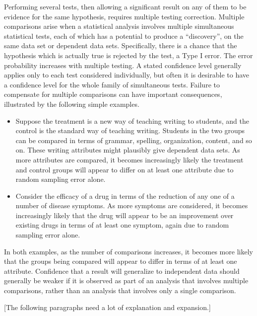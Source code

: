 \documentclass[12pt]{article}
\begin{document}
Performing several tests, then allowing a significant result on any of
them to be evidence for the same hypothesis, requires multiple testing
correction.  Multiple comparisons%
arise when a statistical analysis involves multiple simultaneous
statistical tests, each of which has a potential to produce a
``discovery'', on the same data set or dependent data sets.  Specifically,
there is a chance that the hypothesis which is actually true is rejected
by the test, a Type I error.  The error probability increases with
multiple testing.  A stated confidence level generally applies only to
each test considered individually, but often it is desirable to have a
confidence level for the whole family of simultaneous tests.  Failure to
compensate for multiple comparisons can have important consequences,
illustrated by the following simple examples.
\begin{itemize}
    \item
        Suppose the treatment is a new way of teaching writing to
        students, and the control is the standard way of teaching
        writing.  Students in the two groups can be compared in terms of
        grammar, spelling, organization, content, and so on.  These
        writing attributes might plausibly give dependent data sets.  As
        more attributes are compared, it becomes increasingly likely
        the treatment and control groups will appear to differ on
        at least one attribute due to random sampling error alone.
    \item
        Consider the efficacy of a drug in terms of the reduction of any
        one of a number of disease symptoms.  As more symptoms are
        considered, it becomes increasingly likely that the drug will
        appear to be an improvement over existing drugs in terms of at
        least one symptom, again due to random sampling error alone.
\end{itemize}
In both examples, as the number of comparisons increases, it becomes
more likely that the groups being compared will appear to differ in
terms of at least one attribute.  Confidence that a result will
generalize to independent data should generally be weaker if it is
observed as part of an analysis that involves multiple comparisons,
rather than an analysis that involves only a single comparison.

[The following paragraphs need a lot of explanation and expansion.]
\end{document}
